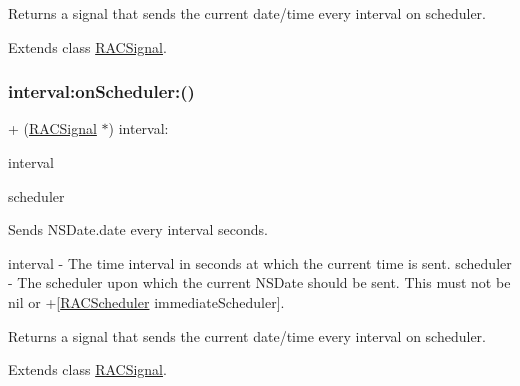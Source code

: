 Returns a signal that sends the current date/time every {\ttfamily interval} on {\ttfamily scheduler}. 

Extends class \mbox{\hyperlink{interface_r_a_c_signal_a65442f423ebf08b9217f7bb206780a45}{R\+A\+C\+Signal}}.

\mbox{\label{category_r_a_c_signal_07_operations_08_a65442f423ebf08b9217f7bb206780a45}} 
\subsubsection{\texorpdfstring{interval\+:on\+Scheduler\+:()}{interval:onScheduler:()}\hspace{0.1cm}{\footnotesize\ttfamily [2/3]}}
{\footnotesize\ttfamily + (\mbox{\hyperlink{interface_r_a_c_signal}{R\+A\+C\+Signal}} $\ast$) interval\+: \begin{DoxyParamCaption}\item[{(N\+S\+Time\+Interval)}]{interval }\item[{onScheduler:(\mbox{\hyperlink{interface_r_a_c_scheduler}{R\+A\+C\+Scheduler}} $\ast$)}]{scheduler }\end{DoxyParamCaption}}

Sends N\+S\+Date.\+date every {\ttfamily interval} seconds.

interval -\/ The time interval in seconds at which the current time is sent. scheduler -\/ The scheduler upon which the current N\+S\+Date should be sent. This must not be nil or +\mbox{[}\mbox{\hyperlink{interface_r_a_c_scheduler}{R\+A\+C\+Scheduler}} immediate\+Scheduler\mbox{]}.

Returns a signal that sends the current date/time every {\ttfamily interval} on {\ttfamily scheduler}. 

Extends class \mbox{\hyperlink{interface_r_a_c_signal_a65442f423ebf08b9217f7bb206780a45}{R\+A\+C\+Signal}}.

\mbox{\label{category_r_a_c_signal_07_operations_08_a65442f423ebf08b9217f7bb206780a45}} 
